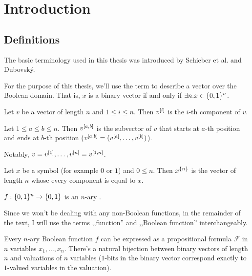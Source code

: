 \chapter{Introduction}

\section{Definitions}

The basic terminology used in this thesis
was introduced by Schieber et al.\cite{Schieber2005154}
and Dubovský.\cite{Dubovsky2012}

\begin{definition}
For the purpose of this thesis,
we'll use the term 
to describe a vector over the Boolean domain.
That is, $x$ is a binary vector if and only if
$\exists n. x \in \{0, 1\}^n$.
\end{definition}

\begin{definition}
Let $v$ be a vector of length $n$ and $1 \leq i \leq n$.
Then $v^{[i]}$ is the $i$-th component of $v$.

Let $1 \leq a \leq b \leq n$.
Then $v^{[a, b]}$ is the subvector of $v$
that starts at $a$-th position
and ends at $b$-th position
($v^{[a, b]} = (v^{[a]}, \ldots, v^{[b]})$).
\end{definition}

Notably,
$v = v^{[1]}, \ldots, v^{[n]} = v^{[1, n]}$.

\begin{definition}
Let $x$ be a symbol (for example $0$ or $1$)
and $0 \leq n$.
Then $x^{\{n\}}$ is the vector of length $n$
whose every component is equal to $x$.
\end{definition}

\begin{definition}
$f: \{0, 1\}^n \rightarrow \{0, 1\}$ is an $n$-ary
.
\end{definition}

Since we won't be dealing with any non-Boolean functions,
in the remainder of the text,
I will use the terms ,,function'' and ,,Boolean function''
interchangeably.

Every $n$-ary Boolean function $f$ can be expressed
as a propositional formula $\mathcal{F}$ in $n$ variables
$x_1, \ldots, x_n$.
There's a natural bijection
between binary vectors of length $n$
and valuations of $n$ variables
($1$-bits in the binary vector
correspond exactly to $1$-valued variables
in the valuation).

